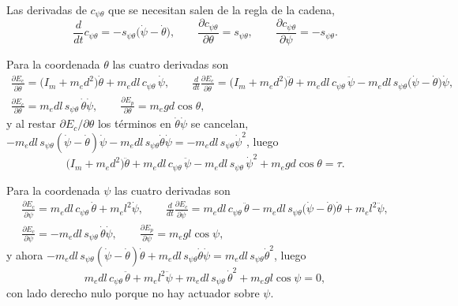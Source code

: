 \documentclass[11pt]{article}
\newcommand{\pd}[2]{\frac{\partial #1}{\partial #2}}
\begin{document}
Las derivadas de $c_{\psi\theta}$ que se necesitan salen de la regla de la cadena,
\begin{equation}
\frac{d}{dt}c_{\psi\theta}=-s_{\psi\theta}\big(\dot\psi-\dot\theta\big),
\qquad
\pd{c_{\psi\theta}}{\theta}=s_{\psi\theta},
\qquad
\pd{c_{\psi\theta}}{\psi}=-s_{\psi\theta}.
\label{eq:E4b}
\end{equation}

Para la coordenada $\theta$ las cuatro derivadas son
\begin{equation}
\begin{gathered}
\pd{E_c}{\dot\theta}=\big(I_m+m_ed^2\big)\dot\theta+m_edl\,c_{\psi\theta}\,\dot\psi,
\qquad
\frac{d}{dt}\pd{E_c}{\dot\theta}=\big(I_m+m_ed^2\big)\ddot\theta+m_edl\,c_{\psi\theta}\,\ddot\psi-m_edl\,s_{\psi\theta}\big(\dot\psi-\dot\theta\big)\dot\psi,\\
\pd{E_c}{\theta}=m_edl\,s_{\psi\theta}\,\dot\theta\dot\psi,
\qquad
\pd{E_p}{\theta}=m_egd\cos\theta ,
\end{gathered}
\label{eq:E5}
\end{equation}
y al restar $\partial E_c/\partial\theta$ los términos en $\dot\theta\dot\psi$ se cancelan, $-m_edl\,s_{\psi\theta}(\dot\psi-\dot\theta)\dot\psi-m_edl\,s_{\psi\theta}\dot\theta\dot\psi=-m_edl\,s_{\psi\theta}\dot\psi^2$, luego
\begin{equation}
\big(I_m+m_ed^2\big)\ddot\theta+m_edl\,c_{\psi\theta}\,\ddot\psi-m_edl\,s_{\psi\theta}\,\dot\psi^2+m_egd\cos\theta=\tau .
\label{eq:E6}
\end{equation}

Para la coordenada $\psi$ las cuatro derivadas son
\begin{equation}
\begin{gathered}
\pd{E_c}{\dot\psi}=m_edl\,c_{\psi\theta}\,\dot\theta+m_el^2\dot\psi,
\qquad
\frac{d}{dt}\pd{E_c}{\dot\psi}=m_edl\,c_{\psi\theta}\,\ddot\theta-m_edl\,s_{\psi\theta}\big(\dot\psi-\dot\theta\big)\dot\theta+m_el^2\ddot\psi,\\
\pd{E_c}{\psi}=-m_edl\,s_{\psi\theta}\,\dot\theta\dot\psi,
\qquad
\pd{E_p}{\psi}=m_egl\cos\psi ,
\end{gathered}
\label{eq:E7}
\end{equation}
y ahora $-m_edl\,s_{\psi\theta}(\dot\psi-\dot\theta)\dot\theta+m_edl\,s_{\psi\theta}\dot\theta\dot\psi=m_edl\,s_{\psi\theta}\dot\theta^2$, luego
\begin{equation}
m_edl\,c_{\psi\theta}\,\ddot\theta+m_el^2\ddot\psi+m_edl\,s_{\psi\theta}\,\dot\theta^2+m_egl\cos\psi=0 ,
\label{eq:E8}
\end{equation}
con lado derecho nulo porque no hay actuador sobre $\psi$.
\end{document}
